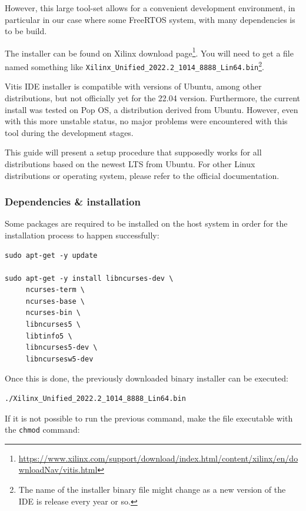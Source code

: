 \documentclass[10pt]{article}
\begin{document}
However, this large tool-set allows for a convenient development environment, in particular
in our case where some FreeRTOS system, with many dependencies is to be build.

The installer can be found on Xilinx download page\footnote{\url{https://www.xilinx.com/support/download/index.html/content/xilinx/en/downloadNav/vitis.html}}. You will need to get
a file named something like \texttt{Xilinx\_Unified\_2022.2\_1014\_8888\_Lin64.bin}\footnote{The name of the installer binary file might change as a new version of
the IDE is release every year or so.}.

Vitis IDE installer is compatible with versions of Ubuntu, among other distributions,
but not officially yet for the 22.04 version.
Furthermore, the current install was tested on Pop OS, a distribution derived from Ubuntu.
However, even with this more unstable status, no major problems were encountered
with this tool during the development stages.

This guide will present a setup procedure that supposedly works for all distributions based on the newest
LTS from Ubuntu. For other Linux distributions or operating system, please refer to the official documentation.

\subsubsection{Dependencies \& installation}
\label{sec:org2926ffa}
Some packages are required to be installed on the host system
in order for the installation process to happen successfully:

\begin{verbatim}
sudo apt-get -y update

sudo apt-get -y install libncurses-dev \
     ncurses-term \
     ncurses-base \
     ncurses-bin \
     libncurses5 \
     libtinfo5 \
     libncurses5-dev \
     libncursesw5-dev
\end{verbatim}

Once this is done, the previously downloaded binary installer can be executed:

\begin{verbatim}
./Xilinx_Unified_2022.2_1014_8888_Lin64.bin
\end{verbatim}

If it is not possible to run the previous command, make the file executable with the \texttt{chmod} command:
\end{document}
